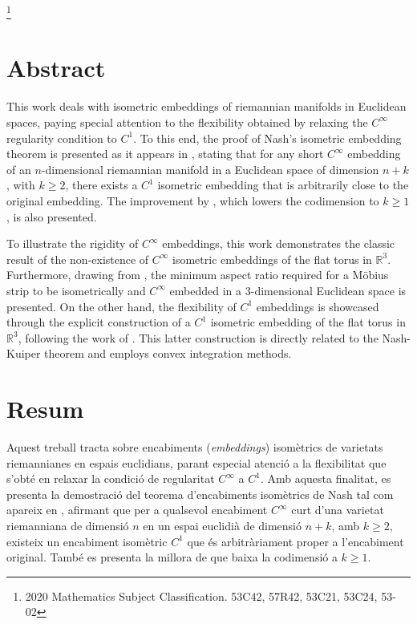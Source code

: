 \documentclass[11pt,a4paper,openright,oneside]{book}
\numberwithin{equation}{section}
\theoremstyle{definition}
\begin{document}
\newpage
{} 
{\let\thefootnote\relax\footnote{2020 Mathematics Subject Classification. 53C42, 57R42, 53C21, 53C24, 53-02}} 
\section*{Abstract}
This work deals with isometric embeddings of riemannian manifolds in Euclidean spaces, paying special attention to the flexibility obtained by relaxing the $C^\infty$ regularity condition to $C^1$. To this end, the proof of Nash's isometric embedding theorem is presented as it appears in \cite{nash1954}, stating that for any short $C^\infty$ embedding of an $n$-dimensional riemannian manifold in a Euclidean space of dimension $n+k$, with $k \geq 2$, there exists a $C^1$ isometric embedding that is arbitrarily close to the original embedding. The improvement by \citet{kuiper1955}, which lowers the codimension to $k \geq 1$, is also presented.

To illustrate the rigidity of $C^\infty$ embeddings, this work demonstrates the classic result of the non-existence of $C^\infty$ isometric embeddings of the flat torus in $\mathbb R^3$. Furthermore, drawing from \citet{schwartz2024}, the minimum aspect ratio required for a Möbius strip to be isometrically and $C^\infty$ embedded in a 3-dimensional Euclidean space is presented. On the other hand, the flexibility of $C^1$ embeddings is showcased through the explicit construction of a $C^1$ isometric embedding of the flat torus in $\mathbb R^3$, following the work of \citet{borrelli2013}. This latter construction is directly related to the Nash-Kuiper theorem and employs convex integration methods.



\section*{Resum}
Aquest treball tracta sobre encabiments (\textit{embeddings}) isomètrics de varietats riemannianes en espais euclidians, parant especial atenció a la flexibilitat que s'obté en relaxar la condició de regularitat $C^\infty$ a $C^1$. Amb aquesta finalitat, es presenta la demostració del teorema d'encabiments isomètrics de Nash tal com apareix en \cite{nash1954}, afirmant que per a qualsevol encabiment $C^\infty$ curt d'una varietat riemanniana de dimensió $n$ en un espai euclidià de dimensió $n+k$, amb $k \geq 2$, existeix un encabiment isomètric $C^1$ que és arbitràriament proper a l'encabiment original. També es presenta la millora de \citet{kuiper1955} que baixa la codimensió a $k\ge1$. 
\end{document}
